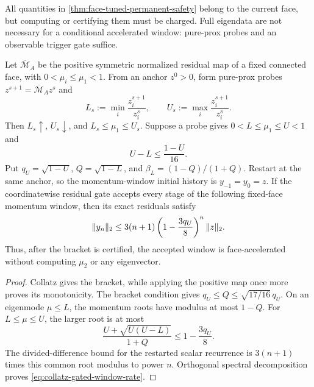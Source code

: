 All quantities in \cref{thm:face-tuned-permanent-safety} belong to the current
face, but computing or certifying them must be charged.  Full eigendata are
not necessary for a conditional accelerated window: pure-prox probes and an
observable trigger gate suffice.

\begin{theorem}
\label{thm:collatz-gated-window}
Let $\overline{\mathcal M}_A$ be the positive symmetric normalized residual
map of a fixed connected face, with $0<\mu_i\leq\mu_1<1$.  From an anchor
$z^0>0$, form pure-prox probes $z^{s+1}=\overline{\mathcal M}_Az^s$ and
\begin{equation*}
 L_s:=\min_i\frac{z_i^{s+1}}{z_i^s},
 \qquad U_s:=\max_i\frac{z_i^{s+1}}{z_i^s}.
\end{equation*}
Then $L_s\uparrow$, $U_s\downarrow$, and $L_s\leq\mu_1\leq U_s$.  Suppose a
probe gives $0<L\leq\mu_1\leq U<1$ and
\begin{equation*}
 U-L\leq\frac{1-U}{16}.
\end{equation*}
Put $q_U=\sqrt{1-U}$, $Q=\sqrt{1-L}$, and
$\beta_L=(1-Q)/(1+Q)$.  Restart at the same anchor, so the momentum-window
initial history is $y_{-1}=y_0=z$.  If the coordinatewise residual gate
accepts every stage of the following fixed-face momentum window, then its exact residuals
satisfy
\begin{equation}
 \lVert y_n\rVert_2
 \leq3(n+1)\left(1-\frac{3q_U}{8}\right)^n\lVert z\rVert_2.
 \label{eq:collatz-gated-window-rate}
\end{equation}
Thus, after the bracket is certified, the accepted window is face-accelerated
without computing $\mu_2$ or any eigenvector.
\end{theorem}

\begin{proof}
Collatz gives the bracket, while applying the positive map once more proves
its monotonicity.  The bracket condition gives
$q_U\leq Q\leq\sqrt{17/16}\,q_U$.  On an eigenmode $\mu\leq L$, the momentum
roots have modulus at most $1-Q$.  For $L\leq\mu\leq U$, the larger root is
at most
\begin{equation*}
 \frac{U+\sqrt{U(U-L)}}{1+Q}
 \leq1-\frac{3q_U}{8}.
\end{equation*}
The divided-difference bound for the restarted scalar recurrence is
$3(n+1)$ times this common root modulus to power $n$.  Orthogonal spectral
decomposition proves \cref{eq:collatz-gated-window-rate}.
\end{proof}

